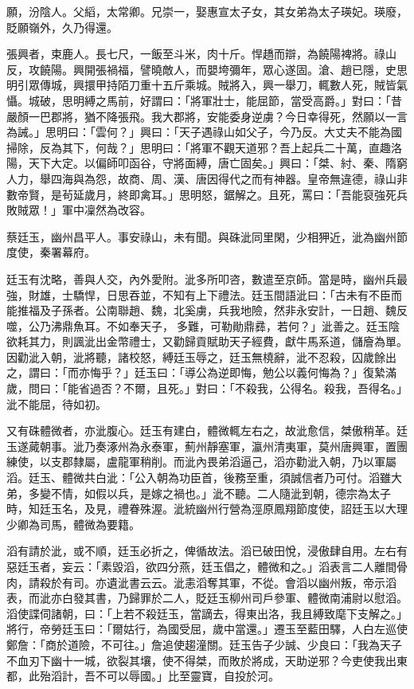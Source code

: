 \begin{pinyinscope}
 願，汾陰人。父縚，太常卿。兄崇一，娶惠宣太子女，其女弟為太子瑛妃。瑛廢，貶願嶺外，久乃得還。



 張興者，束鹿人。長七尺，一飯至斗米，肉十斤。悍趫而辯，為饒陽裨將。祿山反，攻饒陽。興開張禍福，譬曉敵人，而嬰垮彌年，眾心遂固。滄、趙已隱，史思明引眾傳城，興擐甲持陌刀重十五斤乘城。賊將入，興一舉刀，輒數人死，賊皆氣懾。城破，思明縛之馬前，好謂曰：「將軍壯士，能屈節，當受高爵。」對曰：「昔嚴顏一巴郡將，猶不降張飛。我大郡將，安能委身逆虜？今日幸得死，然願以一言為誡。」思明曰：「雲何？」興曰：「天子遇祿山如父子，今乃反。大丈夫不能為國掃除，反為其下，何哉？」思明曰：「將軍不觀天道邪？吾上起兵二十萬，直趣洛陽，天下大定。以偏師叩函谷，守將面縛，唐亡固矣。」興曰：「桀、紂、秦、隋窮人力，舉四海與為怨，故商、周、漢、唐因得代之而有神器。皇帝無違德，祿山非數帝賢，是茍延歲月，終即禽耳。」思明怒，鋸解之。且死，罵曰：「吾能裒強死兵敗賊眾！」軍中凜然為改容。



 蔡廷玉，幽州昌平人。事安祿山，未有聞。與硃泚同里閑，少相狎近，泚為幽州節度使，秦署幕府。



 廷玉有沈略，善與人交，內外愛附。泚多所叩咨，數遣至京師。當是時，幽州兵最強，財雄，士驕悍，日思吞並，不知有上下禮法。廷玉間語泚曰：「古未有不臣而能推福及子孫者。公南聯趙、魏，北奚虜，兵我地險，然非永安計，一日趙、魏反噬，公乃沸鼎魚耳。不如奉天子，多難，可勒勛鼎彞，若何？」泚善之。廷玉陰欲耗其力，則諷泚出金幣禮士，又勸歸貢賦助天子經費，獻牛馬系道，儲廥為單。因勸泚入朝，泚將聽，諸校怒，縛廷玉辱之，廷玉無橈辭，泚不忍殺，囚歲餘出之，謂曰：「而亦悔乎？」廷玉曰：「導公為逆即悔，勉公以義何悔為？」復縶滿歲，問曰：「能省過否？不爾，且死。」對曰：「不殺我，公得名。殺我，吾得名。」泚不能屈，待如初。



 又有硃體微者，亦泚腹心。廷玉有建白，體微輒左右之，故泚愈信，桀傲稍革。廷玉遂蕆朝事。泚乃奏涿州為永泰軍，薊州靜塞軍，瀛州清夷軍，莫州唐興軍，置團練使，以支郡隸屬，盧龍軍稍削。而泚內畏弟滔逼己，滔亦勸泚入朝，乃以軍屬滔。廷玉、體微共白泚：「公入朝為功臣首，後務至重，須誠信者乃可付。滔雖大弟，多變不情，如假以兵，是嫁之禍也。」泚不聽。二人隨泚到朝，德宗為太子時，知廷玉名，及見，禮眷殊渥。泚統幽州行營為涇原鳳翔節度使，詔廷玉以大理少卿為司馬，體微為要籍。



 滔有請於泚，或不順，廷玉必折之，俾循故法。滔已破田悅，浸傲肆自用。左右有惡廷玉者，妄云：「素毀滔，欲四分燕，廷玉倡之，體微和之。」滔表言二人離間骨肉，請殺於有司。亦遺泚書云云。泚恚滔奪其軍，不從。會滔以幽州叛，帝示滔表，而泚亦白發其書，乃歸罪於二人，貶廷玉柳州司戶參軍、體微南浦尉以慰滔。滔使諜伺諸朝，曰：「上若不殺廷玉，當謫去，得東出洛，我且縛致麾下支解之。」將行，帝勞廷玉曰：「爾姑行，為國受屈，歲中當還。」遷玉至藍田驛，人白左巡使鄭詹：「商於道險，不可往。」詹追使趨潼關。廷玉告子少誠、少良曰：「我為天子不血刃下幽十一城，欲裂其壤，使不得桀，而敗於將成，天助逆邪？今吏使我出東都，此殆滔計，吾不可以辱國。」比至靈寶，自投於河。




\end{pinyinscope}
